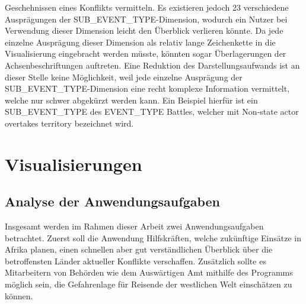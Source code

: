\documentclass[usegeometry=true]{scrartcl}
\begin{document}
Geschehnissen eines Konflikts vermitteln. Es existieren jedoch 23 verschiedene Ausprägungen der SUB\_EVENT\_TYPE-Dimension, wodurch ein Nutzer bei Verwendung dieser Dimension leicht den Überblick verlieren könnte. Da jede einzelne Ausprägung dieser Dimension als relativ lange Zeichenkette in die Visualisierung eingebracht werden müsste, könnten sogar Überlagerungen der Achsenbeschriftungen auftreten. Eine Reduktion des Darstellungsaufwands ist an dieser Stelle keine Möglichkeit, weil jede einzelne Ausprägung der SUB\_EVENT\_TYPE-Dimension eine recht komplexe Information vermittelt, welche nur schwer abgekürzt werden kann. Ein Beispiel hierfür ist ein SUB\_EVENT\_TYPE des EVENT\_TYPE \glqq Battles\grqq{}, welcher mit \glqq Non-state actor overtakes territory\grqq{} bezeichnet wird.\\

\section{Visualisierungen}
\subsection{Analyse der Anwendungsaufgaben}

Insgesamt werden im Rahmen dieser Arbeit zwei Anwendungsaufgaben betrachtet. Zuerst soll die Anwendung Hilfskräften, welche zukünftige Einsätze in Afrika planen, einen schnellen aber gut verständlichen Überblick über die betroffensten Länder aktueller Konflikte verschaffen. Zusätzlich sollte es Mitarbeitern von Behörden wie dem Auswärtigen Amt mithilfe des Programms möglich sein, die Gefahrenlage für Reisende der westlichen Welt einschätzen zu können.\\
\end{document}
